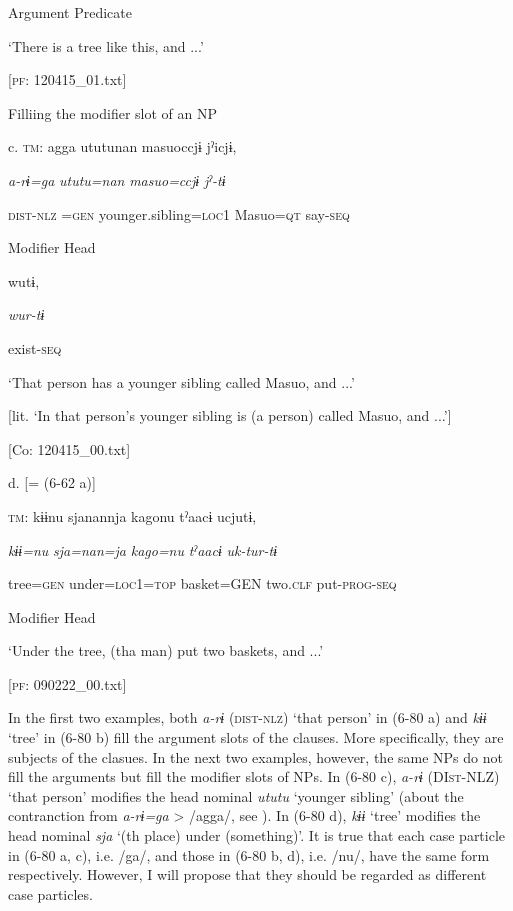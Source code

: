             Argument  Predicate

      ‘There is a tree like this, and ...’

      [\textsc{pf}: 120415\_01.txt]

  Filliing the modifier slot of an NP

  c.  \textsc{tm}:  agga  ututunan  masuoccjɨ  jˀicjɨ,

      \textit{a-rɨ=ga}  \textit{ututu=nan}  \textit{masuo=ccjɨ}  \textit{jˀ-tɨ}

      \textsc{dist}-\textsc{nlz} =\textsc{gen}  younger.sibling=\textsc{loc}1  Masuo=\textsc{qt}  say-\textsc{seq}

      Modifier  Head    

      wutɨ,

      \textit{wur-tɨ}

      exist-\textsc{seq}

      ‘That person has a younger sibling called Masuo, and ...’

[lit. ‘In that person’s younger sibling is (a person) called Masuo, and ...’]

      [Co: 120415\_00.txt]

  d.  [= (6-62 a)]

    \textsc{tm}:  kɨɨnu  sjanannja  kagonu  tˀaacɨ  ucjutɨ,

      \textit{kɨɨ=nu}  \textit{sja=nan=ja}  \textit{kago=nu}  \textit{tˀaacɨ}  \textit{uk-tur-tɨ}

      tree=\textsc{gen}  under=\textsc{loc}1=\textsc{top}  basket=GEN  two.\textsc{clf}  put-\textsc{prog}-\textsc{seq}

      Modifier  Head      

      ‘Under the tree, (tha man) put two baskets, and ...’

      [\textsc{pf}: 090222\_00.txt]

In the first two examples, both \textit{a-rɨ} (\textsc{dist}-\textsc{nlz}) ‘that person’ in (6-80 a) and \textit{kɨɨ} ‘tree’ in (6-80 b) fill the argument slots of the clauses. More specifically, they are subjects of the clasues. In the next two examples, however, the same NPs do not fill the arguments but fill the modifier slots of NPs. In (6-80 c), \textit{a-rɨ} (DI\textsc{st}-NLZ) ‘that person’ modifies the head nominal \textit{ututu} ‘younger sibling’ (about the contranction from \textit{a-rɨ=ga} > /agga/, see ). In (6-80 d), \textit{kɨɨ} ‘tree’ modifies the head nominal \textit{sja} ‘(th place) under (something)’. It is true that each case particle in (6-80 a, c), i.e. /ga/, and those in (6-80 b, d), i.e. /nu/, have the same form respectively. However, I will propose that they should be regarded as different case particles.

